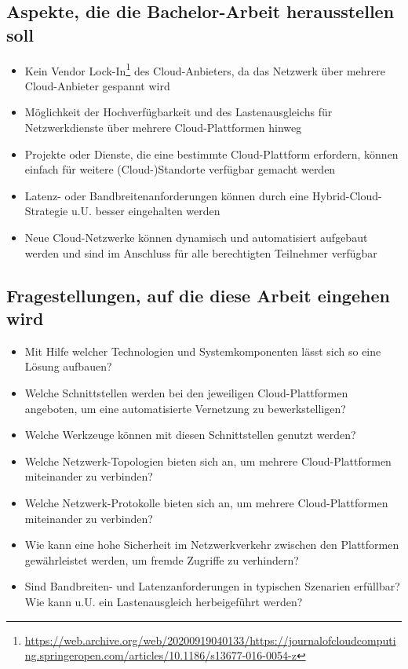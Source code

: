 \subsection{Aspekte, die die Bachelor-Arbeit herausstellen soll}
\begin{itemize}
    \item Kein Vendor Lock-In\footnote{\url{https://web.archive.org/web/20200919040133/https://journalofcloudcomputing.springeropen.com/articles/10.1186/s13677-016-0054-z}} des Cloud-Anbieters, da das Netzwerk über mehrere Cloud-Anbieter gespannt wird
    \item Möglichkeit der Hochverfügbarkeit und des Lastenausgleichs für Netzwerkdienste über mehrere Cloud-Plattformen hinweg
    \item Projekte oder Dienste, die eine bestimmte Cloud-Plattform erfordern, können einfach für weitere (Cloud-)Standorte verfügbar gemacht werden
    \item Latenz- oder Bandbreitenanforderungen können durch eine Hybrid-Cloud-Strategie u.U. besser eingehalten werden
    \item Neue Cloud-Netzwerke können dynamisch und automatisiert aufgebaut werden und sind im Anschluss für alle berechtigten Teilnehmer verfügbar
\end{itemize}

\subsection{Fragestellungen, auf die diese Arbeit eingehen wird}
\begin{itemize}
    \item Mit Hilfe welcher Technologien und Systemkomponenten lässt sich so eine Lösung aufbauen?
    \item Welche Schnittstellen werden bei den jeweiligen Cloud-Plattformen angeboten, um eine automatisierte Vernetzung zu bewerkstelligen?
    \item Welche Werkzeuge können mit diesen Schnittstellen genutzt werden?
    \item Welche Netzwerk-Topologien bieten sich an, um mehrere Cloud-Plattformen miteinander zu verbinden?
    \item Welche Netzwerk-Protokolle bieten sich an, um mehrere Cloud-Plattformen miteinander zu verbinden?
    \item Wie kann eine hohe Sicherheit im Netzwerkverkehr zwischen den Plattformen gewährleistet werden, um fremde Zugriffe zu verhindern?
    \item Sind Bandbreiten- und Latenzanforderungen in typischen Szenarien erfüllbar? Wie kann u.U. ein Lastenausgleich herbeigeführt werden?
\end{itemize}

